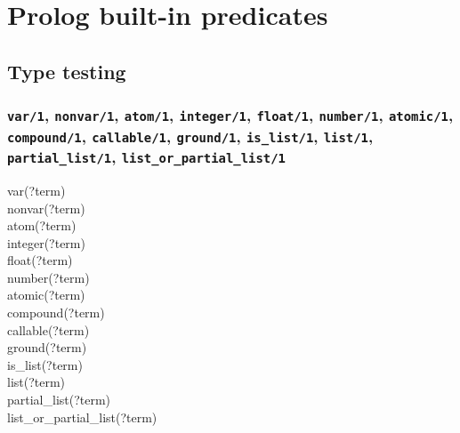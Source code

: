 \newpage
\section{Prolog built-in predicates}
\subsection{Type testing}

\subsubsection{\texttt{var/1},
               \texttt{nonvar/1},
               \texttt{atom/1},
               \texttt{integer/1},
               \texttt{float/1},
               \texttt{number/1},
               \texttt{atomic/1}, \\
               \texttt{compound/1},
               \texttt{callable/1},
               \texttt{ground/1},
               \texttt{is\_list/1},
               \texttt{list/1},
               \texttt{partial\_list/1},
               \texttt{list\_or\_partial\_list/1}}
\label{var/1}

\begin{TemplatesTwoCols}
var(?term)\\
nonvar(?term)\\
atom(?term)\\
integer(?term)\\
float(?term)\\
number(?term)\\
atomic(?term)\\               
compound(?term)\\              
callable(?term)\\            
ground(?term)\\            
is\_list(?term)\\                 
list(?term)\\                 
partial\_list(?term)\\      
list\_or\_partial\_list(?term)

\end{TemplatesTwoCols}

